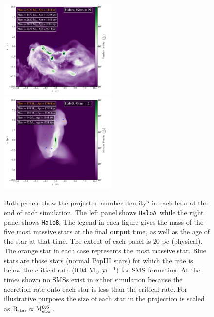 \documentclass[twocolumn,iop,revtex4]{openjournal}
\newcommand{\msolaryrc} {$\rm{M_{\odot}~yr^{-1}}$}
\newcommand{\ha} {\texttt{HaloA~}}
\newcommand{\hbc} {\texttt{HaloB}}
\begin{document}
\begin{figure}
\centering
\begin{minipage}{175mm}      \begin{center} 
\centerline{
\includegraphics[width=0.52\textwidth]{FIGURES/HaloA/Proj_z_number_density_2001.pdf}
\includegraphics[width=0.52\textwidth]{FIGURES/HaloB/Proj_z_number_density_1844.pdf}}
\caption{Both panels show the projected number density$^5$ in each halo at the end of each
  simulation. The left panel shows \ha while the right panel shows \hbc.
  The legend in each figure gives the mass of the five most massive stars at the final output
  time, as well as
  the age of the star at that time. The extent of each panel is 20 pc (physical). The orange
  star in each case represents the most massive star. Blue stars are those stars
  (normal PopIII stars) for which the rate is below the critical rate (0.04 \msolaryrc) for
  SMS formation. At the times shown no
  SMSs exist in either simulation because the accretion rate onto each star is less than the
  critical rate.  For illustrative purposes the size of each star in the
  projection is scaled as $\rm{R_{star}} \propto \rm{M_{star}^{0.6}}$.}  \label{Fig:ProjectionEnd}
\end{center} \end{minipage}

\end{figure}
\end{document}

